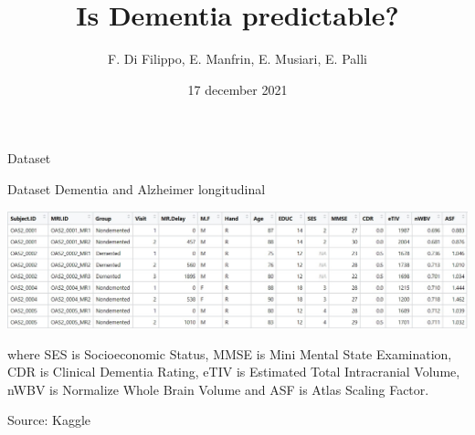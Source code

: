 \documentclass{beamer}
\title{{\LARGE Is Dementia predictable?}}
\author{F. Di Filippo, E. Manfrin, E. Musiari, E. Palli}
\date{17 december 2021}
\begin{document}
	
	\begin{frame}
		\maketitle
	\end{frame}
	
	
	\begin{frame}{Dataset}
		
		Dataset Dementia and Alzheimer longitudinal
		\begin{center}
			
			
			\includegraphics[width=\columnwidth]{dataset_al.jpeg}
		\end{center}
		
		
		where SES is Socioeconomic Status, MMSE is Mini Mental State Examination, CDR is Clinical Dementia Rating, eTIV is Estimated Total Intracranial Volume, nWBV is Normalize Whole Brain Volume and ASF is Atlas Scaling Factor.
		
		\vspace{0.1 cm}
		Source: Kaggle
		
		
	\end{frame}
	
	
	
\end{document}
